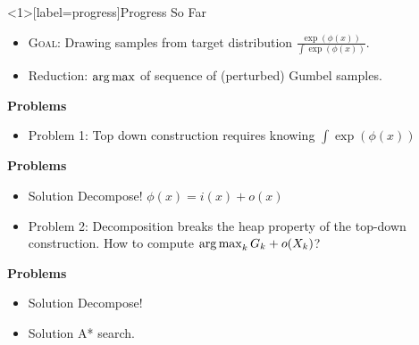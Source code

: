 \begin{frame}<1>[label=progress]{Progress So Far}
  \begin{itemize}[<+->]
  \item \textsc{Goal}: Drawing samples from target distribution $\frac{\exp(\phi(x))}{\int \exp(\phi(x))}$.
  \item Reduction: $\operatorname*{{arg\,max}}$ of sequence of (perturbed) Gumbel samples.
  \end{itemize}
  \begin{overprint}

    \textbf{Problems}
    \begin{itemize}
    \item {\color{red}Problem 1:} Top down construction requires knowing $\int \exp(\phi(x))$        %
    \end{itemize}

    \textbf{Problems}
    \begin{itemize} 
    \item {\color{blue} Solution} Decompose! $\phi(x) = i(x) + o(x)$%
    \item {\color{red} Problem 2:} Decomposition breaks the heap property of the top-down construction. How to compute $\operatorname*{{arg\,max}}_k G_k + o(X_k)$? %
    \end{itemize}

    \textbf{Problems}
    \begin{itemize} 
    \item {\color{blue} Solution} Decompose! %
    \item {\color{blue} Solution} A* search.
    \end{itemize}
  \end{overprint}
\end{frame}

